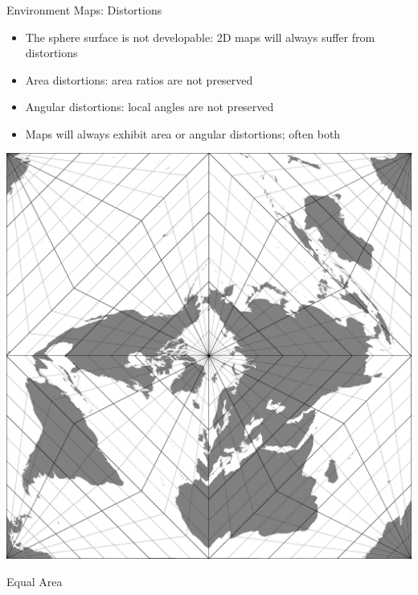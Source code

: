 \documentclass[utf8,stillsansserifmath,fleqn,t]{beamer}
\begin{document}
\begin{frame}
\frametitle{\insertsection}
Environment Maps: Distortions
\begin{itemize}
\item The sphere surface is not developable: 2D maps will always suffer from
distortions
\item Area distortions: area ratios are not preserved
\item Angular distortions: local angles are not preserved
\item Maps will always exhibit area or angular distortions; often both
\end{itemize}
\begin{minipage}{.3\textwidth}
\includegraphics[width=\textwidth]{./fig/world-lea-quinc-shirley.pdf}
\centerline{Equal Area}
\centerline{~}
\end{minipage}\hfill
\begin{minipage}{.3\textwidth}

\end{minipage}
\end{frame}
\end{document}
